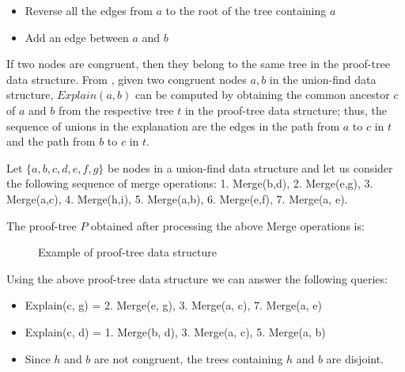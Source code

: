 \begin{itemize}
  \item Reverse all the edges from $a$ to the root
    of the tree containing $a$
  \item Add an edge between $a$ and $b$
\end{itemize}

If two nodes are congruent, then they belong to the same tree
in the proof-tree data structure. 
From \cite{10.1007/978-3-540-32033-3_33}, given two congruent 
nodes $a, b$ in the union-find data structure, 
$Explain(a, b)$ can be computed by obtaining the common ancestor
$c$ of $a$ and $b$ from the respective tree $t$ in the proof-tree data
structure; thus, the sequence of unions in the explanation 
are the edges in the 
path from $a$ to $c$ in $t$ and the path from $b$ to $c$ in $t$.

\begin{example}
  Let $\{a, b, c, d, e, f, g\}$ be nodes in a union-find data
  structure and let us consider the following sequence of 
  merge operations: 1. Merge(b,d), 2. Merge(e,g), 3. Merge(a,c), 
  4. Merge(h,i), 5. Merge(a,b), 6. Merge(e,f), 7. Merge(a, e).

  The proof-tree $P$ obtained after processing the above
  Merge operations is:

  \begin{figure}[H]
    \centering
    \caption{Example of proof-tree data structure}
  \end{figure}

  Using the above proof-tree data structure we can answer
  the following queries:

  \begin{itemize}
    \item Explain(c, g) = 2. Merge(e, g), 3. Merge(a, c), 7. Merge(a, e)
    \item Explain(c, d) = 1. Merge(b, d), 3. Merge(a, c), 5. Merge(a, b)
    \item Since $h$ and $b$ are not congruent, the
      trees containing $h$ and $b$ are disjoint.
  \end{itemize}

\end{example}

